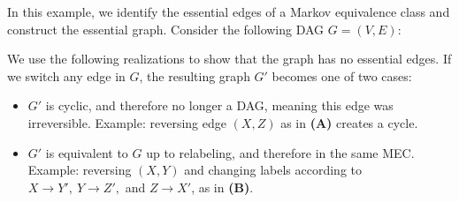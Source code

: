 \begin{example}\label{essentialgraphexample} In this example, we identify the essential edges of a Markov equivalence class and construct the essential graph. Consider the following DAG $G = (V,E)$:

\begin{figure}[h!]
\begin{center}
\end{center}
\caption{}
\end{figure}

We use the following realizations to show that the graph has no essential edges. If we switch any edge in $G$, the resulting graph $G'$ becomes one of two cases:
\begin{itemize}
	\item $G'$ is cyclic, and therefore no longer a DAG, meaning this edge was irreversible. 
		\newline \null \quad Example: reversing edge $(X,Z)$ as in \textbf{(A)} creates a cycle.

		\begin{center}
		\end{center} 
			
	\item $G'$ is equivalent to $G$ up to relabeling, and therefore in the same MEC.
		\newline \null \quad Example: reversing $(X,Y)$ and changing labels according to $X \rightarrow Y',\  Y\rightarrow Z',$  and $Z \rightarrow X'$, as in \textbf{(B)}.
\end{itemize} 


\end{example}
